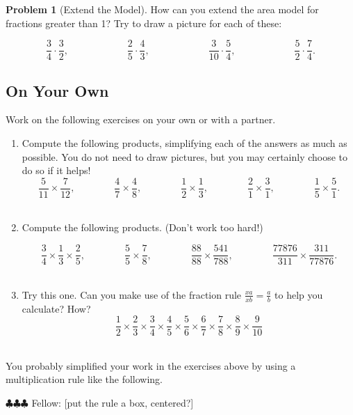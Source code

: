\documentclass[10pt, reqno]{amsart}
\theoremstyle{remark}
\theoremstyle{definition}
\newtheorem{problem}{Problem}
\numberwithin{equation}{section}  %
\newcommand{\fellow}[1]{{\color{magenta} \sf $\clubsuit\clubsuit\clubsuit$ Fellow: [#1]}}
\begin{document}
\begin{problem}[Extend the Model]
How can you extend the area model for fractions greater than 1?  Try to draw a picture for each of these:

\[
\frac 3 4 \cdot \frac 3 2,
\qquad \qquad\qquad
\frac 2 5 \cdot \frac 4 3,
\qquad \qquad\qquad
\frac 3 {10} \cdot \frac 5 4,
\qquad \qquad\qquad
\frac 5 2 \cdot \frac 7 4.
\]

\end{problem}





\subsection*{On Your Own} 
Work on the following exercises on your own or with a partner.

\begin{enumerate}
\item
Compute the following products, simplifying each of the answers as
much as possible.  You do not need to draw pictures, but you may certainly choose to do so if it helps! 
\[
\frac 5{11} \times \frac 7{12},
\qquad\qquad
\frac 4 7 \times \frac 4 8,
\qquad\qquad
\frac 1 2 \times \frac 1 3,
\qquad\qquad
\frac 2 1 \times \frac 3 1,
\qquad\qquad
\frac 15 \times \frac 51.
\]\\

\item
Compute the following products.  (Don't work too hard!)

\[
\frac 3 4 \times \frac 1 3 \times \frac 2 5,
\qquad\qquad
\frac 5 5 \times \frac 7 8 ,
\qquad\qquad
\frac{88}{88} \times \frac{541}{788},
\qquad\qquad
\frac{77876}{311} \times \frac{311}{77876}.
\]\\

\item
Try this one.  Can you make use of the fraction rule $\frac{xa}{xb} = \frac a b$ to help you calculate?  How?
\[
\frac 1 2 \times \frac 23 \times \frac 34 \times \frac 45 \times \frac 56\times \frac 67 \times \frac 78 \times\frac 89 \times
\frac9{10}
\]\\

\end{enumerate}


You probably simplified your work in the exercises above by using a multiplication rule like the following.

\fellow{put the rule a box, centered?}
\end{document}
